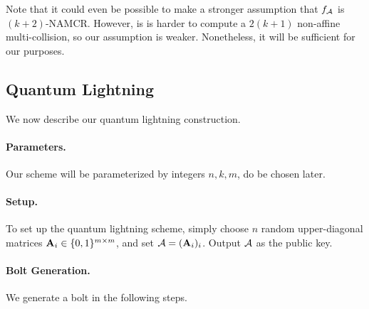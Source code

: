 Note that it could even be possible to make a stronger assumption that $f_{\mathcal{A}}$ is $(k+2)$-NAMCR.  However, is is harder to compute a $2(k+1)$ non-affine multi-collision, so our assumption is weaker.  Nonetheless, it will be sufficient for our purposes.

\subsection{Quantum Lightning}

We now describe our quantum lightning construction.

\paragraph{Parameters.} Our scheme will be parameterized by integers $n,k,m$, do be chosen later.

\paragraph{Setup.}  To set up the quantum lightning scheme, simply choose $n$ random upper-diagonal matrices ${\mathbf{A}}_i\in\{0,1\}^{m\times m}$, and set ${\mathcal{A}}=({\mathbf{A}}_i)_i$.  Output ${\mathcal{A}}$ as the public key.


\paragraph{Bolt Generation.}  We generate a bolt in the following steps.

